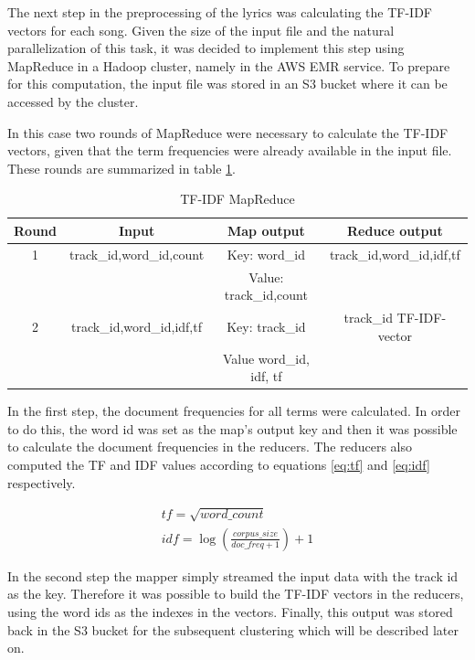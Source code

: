 \documentclass[11pt,a4paper]{scrartcl}
\begin{document}
    The next step in the preprocessing of the lyrics was calculating the
    TF-IDF vectors for each song. Given the size of the input file and the
    natural parallelization of this task, it was decided to implement this
    step using MapReduce in a Hadoop cluster, namely in the AWS EMR service.
    To prepare for this computation, the input file was stored in an S3 bucket
    where it can be accessed by the cluster.
    
    In this case two rounds of MapReduce were necessary to calculate
    the TF-IDF vectors, given that the term frequencies were already available in
    the input file.
    These rounds are summarized in table \ref{tab:mapreduce-tfidf}.
    
    \begin{table}
	    \centering
	    \caption{TF-IDF MapReduce}
	    \begin{tabular}{|c||c||c||c|}
	      \hline
	      Round & Input & Map output & Reduce output \\
	      \hline
	      1 & track\_id,word\_id,count & Key: word\_id &
	      track\_id,word\_id,idf,tf\\
	        &                          & Value: track\_id,count & \\
	      \hline
	      2 & track\_id,word\_id,idf,tf & Key: track\_id & track\_id
	      TF-IDF-vector\\
	        &                           & Value word\_id, idf, tf & \\
	      \hline
      \end{tabular}
      \label{tab:mapreduce-tfidf}
    \end{table}
    
    In the first step, the document frequencies for all terms were calculated. In
    order to do this, the word id was set as the map's output key and then
    it was possible to calculate the document frequencies in the reducers.
    The reducers also computed the TF and IDF values according to equations
    \ref{eq:tf} and \ref{eq:idf} respectively.
    
    \begin{eqnarray}
      \label{eq:tf}
      tf = \sqrt{word\_count}\\
      \label{eq:idf}
      idf = \log{\left(\frac{corpus\_size}{doc\_freq + 1}\right)} + 1
    \end{eqnarray}
    
    In the second step the mapper simply streamed the input data with the track
    id as the key. Therefore it was possible to build the TF-IDF vectors in the
    reducers, using the word ids as the indexes in the vectors.
    Finally, this output was stored back in the S3 bucket for the subsequent
    clustering which will be described later on.
  
\end{document}
